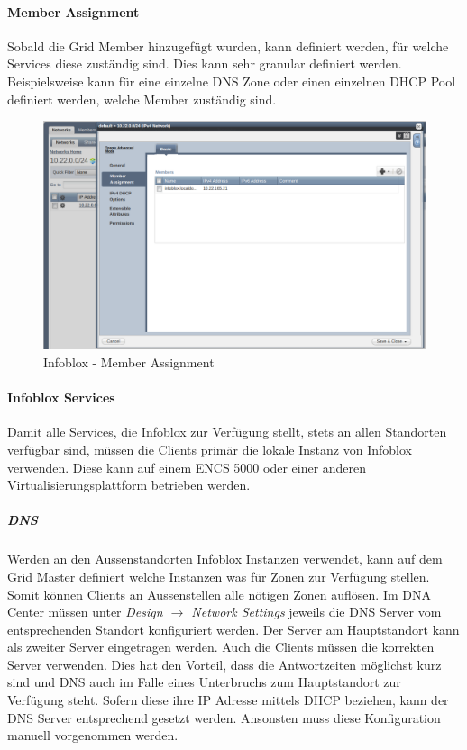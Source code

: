 \paragraph{Member Assignment}

Sobald die Grid Member hinzugefügt wurden, kann definiert werden, für welche Services diese zuständig sind. Dies kann sehr granular definiert werden. Beispielsweise kann für eine einzelne DNS Zone oder einen einzelnen DHCP Pool definiert werden, welche Member zuständig sind.

\begin{figure}[H]
	\centering
	\includegraphics[width=1\linewidth]{img/Absicherung/Infoblox_Member_Assignment.png}
	\caption{Infoblox - Member Assignment}
	\label{fig:Infoblox - Member Assignment}
\end{figure}

\paragraph{Infoblox Services}

Damit alle Services, die Infoblox zur Verfügung stellt, stets an allen Standorten verfügbar sind, müssen die Clients primär die lokale Instanz von Infoblox verwenden. Diese kann auf einem ENCS 5000 oder einer anderen Virtualisierungsplattform betrieben werden.

\subparagraph{DNS}

Werden an den Aussenstandorten Infoblox Instanzen verwendet, kann auf dem Grid Master definiert welche Instanzen was für Zonen zur Verfügung stellen. Somit können Clients an Aussenstellen alle nötigen Zonen auflösen.
Im DNA Center müssen unter \textit{Design $\rightarrow$ Network Settings} jeweils die DNS Server vom entsprechenden Standort konfiguriert werden. Der Server am Hauptstandort kann als zweiter Server eingetragen werden.
Auch die Clients müssen die korrekten Server verwenden. Dies hat den Vorteil, dass die Antwortzeiten möglichst kurz sind und DNS auch im Falle eines Unterbruchs zum Hauptstandort zur Verfügung steht. Sofern diese ihre IP Adresse mittels DHCP beziehen, kann der DNS Server entsprechend gesetzt werden. Ansonsten muss diese Konfiguration manuell vorgenommen werden.

